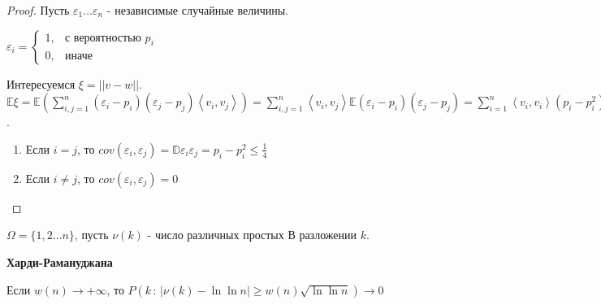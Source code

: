 \begin{proof}
    Пусть $\varepsilon_1 \ldots \varepsilon_n$ - независимые случайные величины.
    
    $
    \varepsilon_{i} = 
    \begin{cases}
        1, & \text{с вероятностью $p_i$} \\
        0, & \text{иначе}
    \end{cases}
    $

    Интересуемся $\xi = || v - w ||$. $\mathbb{E} \xi = \mathbb{E} (\sum_{i, j = 1}^n (\varepsilon_i - p_i)(\varepsilon_j - p_j) \left < v_i, v_j \right > ) = 
    \sum_{i, j = 1}^{n} \left < v_i, v_j \right > \mathbb{E} (\varepsilon_i - p_i)(\varepsilon_j - p_j) = \sum_{i = 1}^{n} \left < v_i, v_i \right > (p_i - p_i^2) \leqslant \frac{n}{4}$.

    \begin{enumerate}
        \item Если $i = j$, то $cov(\varepsilon_i, \varepsilon_j) = \mathbb{D}\varepsilon_i\varepsilon_j = p_i - p_i^2 \leqslant \frac{1}{4}$
        \item Если $i \neq j$, то $cov (\varepsilon_i, \varepsilon_j) = 0$
    \end{enumerate}
\end{proof}

\begin{example}
    $\Omega = \{ 1, 2 \ldots n \}$, пусть $\nu (k)$ - число различных простых В
    разложении $k$.

    \begin{theorem}
        \textbf{Харди-Рамануджана}

        Если $w(n) \to +\infty$, то $P(k \, : \, | \nu (k) - \ln \ln n| \geqslant w(n) \sqrt{\ln \ln n}) \to 0$
    \end{theorem}
\end{example}

